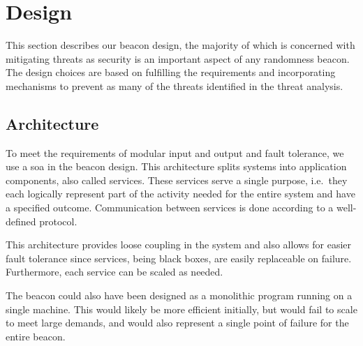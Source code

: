 \section{Design}\label{sec:design}
This section describes our beacon design, the majority of which is concerned with mitigating threats as security is an important aspect of any randomness beacon.
The design choices are based on fulfilling the requirements and incorporating mechanisms to prevent as many of the threats identified in the threat analysis.

\subsection{Architecture}\label{sec:design_architecture}
To meet the requirements of modular input and output and fault tolerance, we use a \gls{soa} in the beacon design.
This architecture splits systems into application components, also called services.
These services serve a single purpose, i.e.\ they each logically represent part of the activity needed for the entire system and have a specified outcome.
Communication between services is done according to a well-defined protocol.

This architecture provides loose coupling in the system and also allows for easier fault tolerance since services, being black boxes, are easily replaceable on failure.
Furthermore, each service can be scaled as needed.

The beacon could also have been designed as a monolithic program running on a single machine.
This would likely be more efficient initially, but would fail to scale to meet large demands, and would also represent a single point of failure for the entire beacon.

